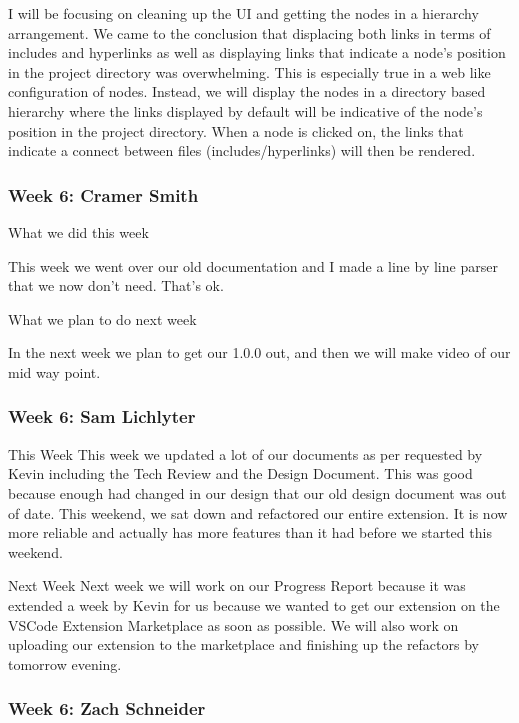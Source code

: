 I will be focusing on cleaning up the UI and getting the nodes in a hierarchy arrangement. We came to the conclusion that displacing both links in terms of includes and hyperlinks as well as displaying links that indicate a node's position in the project directory was overwhelming. This is especially true in a web like configuration of nodes. Instead, we will display the nodes in a directory based hierarchy where the links displayed by default will be indicative of the node's position in the project directory. When a node is clicked on, the links that indicate a connect between files (includes/hyperlinks) will then be rendered.

\subsubsection{Week 6: Cramer Smith}

What we did this week

This week we went over our old documentation and I made a line by line parser that we now don't need. That's ok.

What we plan to do next week

In the next week we plan to get our 1.0.0 out, and then we will make video of our mid way point. 

\subsubsection{Week 6: Sam Lichlyter}

This Week
This week we updated a lot of our documents as per requested by Kevin including the Tech Review and the Design Document. This was good because enough had changed in our design that our old design document was out of date. This weekend, we sat down and refactored our entire extension. It is now more reliable and actually has more features than it had before we started this weekend. 

Next Week
Next week we will work on our Progress Report because it was extended a week by Kevin for us because we wanted to get our extension on the VSCode Extension Marketplace as soon as possible. We will also work on uploading our extension to the marketplace and finishing up the refactors by tomorrow evening.

\subsubsection{Week 6: Zach Schneider}

